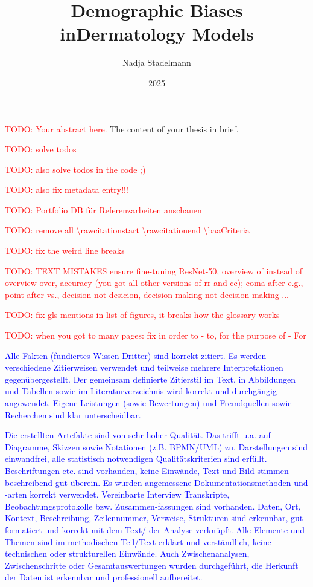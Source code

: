 \documentclass[12pt, a4paper, oneside]{book}   	%
\author{Nadja Stadelmann}                       %
\title{Demographic Biases in\linebreak Dermatology Models}   %
\subtitle{\large \todo{subtitle}}               %
\date{2025}                                     %
\renewcommand{\todo}[1]{\textcolor{red}{TODO: #1}}
\newcommand{\baaCriteria}[1]{\textcolor{blue}{#1}}
\begin{document}
	\english                                        %
	\maketitle
	
	
	\begin{abstractstyle}{\hsummary}
		\todo{Your abstract here.}
	    The content of your thesis in brief.
	\end{abstractstyle}
	
	\tableofcontents
	
	\listoftodos
	\todo{solve todos} 
	
	
	\todo{also solve todos in the code ;)} 
	
	
	\todo{also fix metadata entry!!!} 
	
	
	\todo{Portfolio DB für Referenzarbeiten anschauen}
	
	\todo{remove all \textbackslash rawcitationstart \textbackslash rawcitationend  \textbackslash baaCriteria}
	
	\todo{fix the weird line breaks}
	
	\todo{TEXT MISTAKES ensure fine-tuning ResNet-50, overview of instead of overview over, accuracy (you got all other versions of rr and cc); coma after e.g., point after vs., decision not desicion, decision-making not decision making ...}
	
	\todo{fix gls mentions in list of figures, it breaks how the glossary works}
	
	\todo{when you got to many pages: fix in order to - to, for the purpose of - For}
	
	
	\baaCriteria{Alle Fakten (fundiertes Wissen Dritter) sind korrekt zitiert. Es werden verschiedene Zitierweisen verwendet und teilweise mehrere Interpretationen gegenübergestellt. Der gemeinsam definierte Zitierstil im Text, in Abbildungen und Tabellen sowie im Literaturverzeichnis wird korrekt und durchgängig angewendet. Eigene Leistungen (sowie Bewertungen) und Fremdquellen sowie Recherchen sind klar unterscheidbar.} 
	
	
	\baaCriteria{Die erstellten Artefakte sind von sehr hoher Qualität. Das trifft u.a. auf Diagramme, Skizzen sowie Notationen (z.B. BPMN/UML) zu. Darstellungen sind einwandfrei, alle statistisch notwendigen Qualitätskriterien sind erfüllt. Beschriftungen etc. sind vorhanden, keine Einwände, Text und Bild stimmen beschreibend gut überein. Es wurden angemessene Dokumentationsmethoden und -arten korrekt verwendet. Vereinbarte Interview Transkripte, Beobachtungsprotokolle bzw. Zusammen-fassungen sind vorhanden. Daten, Ort, Kontext, Beschreibung, Zeilennummer, Verweise, Strukturen sind erkennbar, gut formatiert und korrekt mit dem Text/ der Analyse verknüpft. Alle Elemente und Themen sind im methodischen Teil/Text erklärt und verständlich, keine technischen oder strukturellen Einwände. Auch Zwischenanalysen, Zwischenschritte oder Gesamtauswertungen wurden durchgeführt, die Herkunft der Daten ist erkennbar und professionell aufbereitet.} 
	
\end{document}
